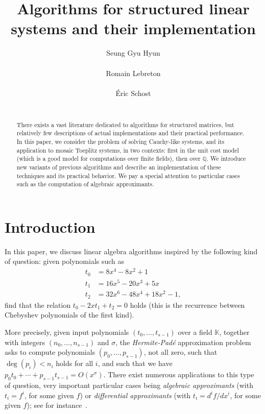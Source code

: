 \documentclass{sig-alternate}
\author{
\alignauthor
Seung Gyu Hyun\\
\affaddr{Cheriton School of Computer Science} \\
\affaddr{University of Waterloo}
\email{sghyun@edu.uwaterloo.ca}
\alignauthor
Romain Lebreton\\
\affaddr{LIRMM} \\
\affaddr{Universit\'e Montpellier2}
\email{romain.lebreton@lirmm.fr}
\alignauthor
\'Eric Schost\\
\affaddr{Cheriton School of Computer Science} \\
\affaddr{University of Waterloo}
\email{eschost@uwaterloo.ca}
}
\title{Algorithms for structured linear systems and their implementation}
\newcommand{\K}{\ensuremath{\mathbb{K}}}
\newcommand{\Q}{\ensuremath{\mathbb{Q}}}
\begin{document}
\maketitle

\begin{abstract}
  There exists a vast literature dedicated to algorithms for
  structured matrices, but relatively few descriptions of actual
  implementations and their practical performance. In this paper, we
  consider the problem of solving Cauchy-like systems, and its
  application to mosaic Toeplitz systems, in two contexts: first in
  the unit cost model (which is a good model for computations over
  finite fields), then over $\Q$. We introduce new variants of
  previous algorithms and describe an implementation of these
  techniques and its practical behavior. We pay a special attention to
  particular cases such as the computation of algebraic approximants.
\end{abstract}


\section{Introduction}

In this paper, we discuss linear algebra algorithms inspired by the
following kind of question: given polynomials such as
\begin{align*}
t_0 &= 8x^4 - 8x^2 + 1\\
t_1 &= 16x^5 - 20x^3 + 5x\\
t_2 &= 32x^6 - 48x^4 + 18x^2 - 1,
\end{align*}
find that the relation $t_0-2x t_1+t_2=0$ holds (this is the
recurrence between Chebyshev polynomials of the first kind).  

More precisely, given input polynomials $(t_0,\dots,t_{s-1})$ over a
field $\K$, together with integers $(n_0,\dots,n_{s-1})$ and $\sigma$,
the {\em Hermite-Pad\'e} approximation problem asks to compute
polynomials $(p_0,\dots,p_{s-1})$, not all zero, such that $\deg(p_i)
< n_i$ holds for all $i$, and such that we have $p_0 t_0 + \cdots +
p_{s-1} t_{s-1}=O(x^\sigma)$. There exist numerous applications to
this type of question, very important particular cases being {\em
  algebraic approximants} (with $t_i =f^i$, for some given $f$) or
{\em differential approximants} (with $t_i =d^if/dx^i$, for some given
$f$); see for instance~\cite[Chapitre~7]{BoChGiLeLeSaSc17}.
\end{document}
